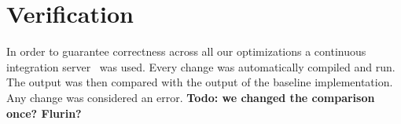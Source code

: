 \section{Verification}\label{sec:verification}
In order to guarantee correctness across all our optimizations a continuous integration server~\cite{jenkins} was used. Every change was automatically compiled and run. The output was then compared with the output of the baseline implementation. Any change was considered an error. \textbf{Todo: we changed the comparison once? Flurin?}